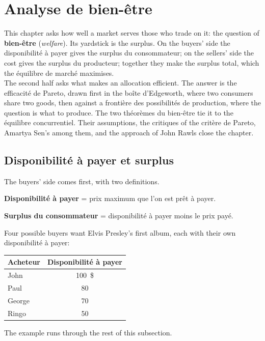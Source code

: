 \section{Analyse de bien-être}

This chapter asks how well a market serves those who trade on it: the question of
\textbf{bien-être} (\textit{welfare}). Its yardstick is the surplus. On the buyers'
side the disponibilité à payer gives the surplus du consommateur; on the sellers'
side the cost gives the surplus du producteur; together they make the surplus total,
which the équilibre de marché maximises.\\

The second half asks what makes an allocation efficient. The answer is the
efficacité de Pareto, drawn first in the boîte d'Edgeworth, where two consumers
share two goods, then against a frontière des possibilités de production, where the
question is what to produce. The two théorèmes du bien-être tie it to the équilibre
concurrentiel. Their assumptions, the critiques of the critère de Pareto, Amartya
Sen's among them, and the approach of John Rawls close the chapter.

\subsection{Disponibilité à payer et surplus}

The buyers' side comes first, with two definitions.

\begin{definition}
  \textbf{Disponibilité à payer} = prix maximum que l'on est prêt à payer.
\end{definition}

\begin{definition}
  \textbf{Surplus du consommateur} = disponibilité à payer moins le prix payé.
\end{definition}

\begin{example}
  Four possible buyers want Elvis Presley's first album, each with their own
  disponibilité à payer:
  \begin{center}
    \begin{tabular}{@{}lc@{}}
      \toprule
      Acheteur & Disponibilité à payer \\
      \midrule
      John & 100~\$ \\
      Paul & 80 \\
      George & 70 \\
      Ringo & 50 \\
      \bottomrule
    \end{tabular}
  \end{center}
  The example runs through the rest of this subsection.
\end{example}

